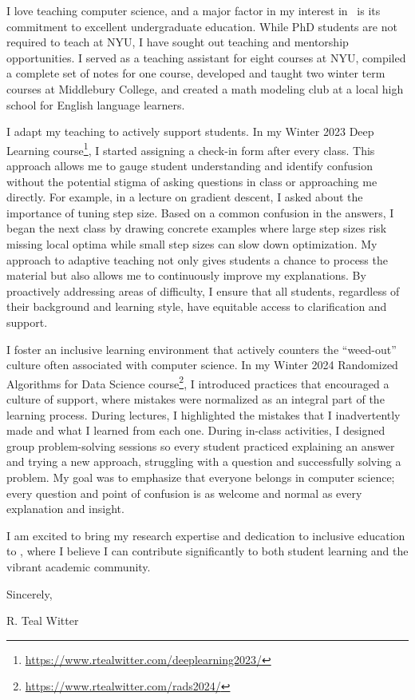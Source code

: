 \documentclass[11pt]{article}
\begin{document}
{I love teaching computer science, and a major factor in my interest in \school~is its commitment to excellent undergraduate education. While PhD students are not required to teach at NYU, I have sought out teaching and mentorship opportunities. I served as a teaching assistant for eight courses at NYU, compiled a complete set of notes for one course, developed and taught two winter term courses at Middlebury College, and created a math modeling club at a local high school for English language learners.

I adapt my teaching to actively support students. In my Winter 2023 Deep Learning course\footnote{\url{https://www.rtealwitter.com/deeplearning2023/}}, I started assigning a check-in form after every class. This approach allows me to gauge student understanding and identify confusion without the potential stigma of asking questions in class or approaching me directly. For example, in a lecture on gradient descent, I asked about the importance of tuning step size. Based on a common confusion in the answers, I began the next class by drawing concrete examples where large step sizes risk missing local optima while small step sizes can slow down optimization. My approach to adaptive teaching not only gives students a chance to process the material but also allows me to continuously improve my explanations. By proactively addressing areas of difficulty, I ensure that all students, regardless of their background and learning style, have equitable access to clarification and support.

I foster an inclusive learning environment that actively counters the “weed-out” culture often associated with computer science. In my Winter 2024 Randomized Algorithms for Data Science course\footnote{\url{https://www.rtealwitter.com/rads2024/}}, I introduced practices that encouraged a culture of support, where mistakes were normalized as an integral part of the learning process. During lectures, I highlighted the mistakes that I inadvertently made and what I learned from each one. During in-class activities, I designed group problem-solving sessions so every student practiced explaining an answer and trying a new approach, struggling with a question and successfully solving a problem. My goal was to emphasize that everyone belongs in computer science; every question and point of confusion is as welcome and normal as every explanation and insight.

I am excited to bring my research expertise and dedication to inclusive education to \school, where I believe I can contribute significantly to both student learning and the vibrant academic community.

Sincerely,

\vspace{1em}

{\bsifamily R. Teal Witter}

}
\end{document}
